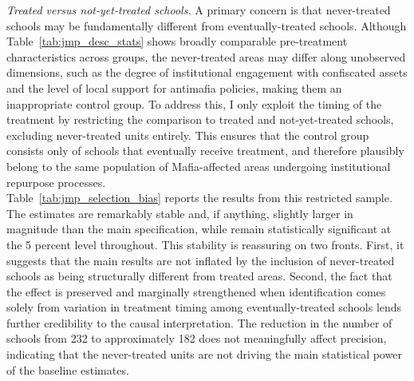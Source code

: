 \documentclass[12pt]{article}
\theoremstyle{plain}
\theoremstyle{plain}
\theoremstyle{plain}
\theoremstyle{definition}
\theoremstyle{plain}
\theoremstyle{definition}
\theoremstyle{plain}
\theoremstyle{remark}
\theoremstyle{definition}
\theoremstyle{definition}
\theoremstyle{plain}
\begin{document}
\emph{Treated versus not-yet-treated schools.} A primary concern is that never-treated schools may be fundamentally different from eventually-treated schools. Although Table~\ref{tab:jmp_desc_stats} shows broadly comparable pre-treatment characteristics across groups, the never-treated areas may differ along unobserved dimensions, such as the degree of institutional engagement with confiscated assets and the level of local support for antimafia policies, making them an inappropriate control group. To address this, I only exploit the timing of the treatment by restricting the comparison to treated and not-yet-treated schools, excluding never-treated units entirely. This ensures that the control group consists only of schools that eventually receive treatment, and therefore plausibly belong to the same population of Mafia-affected areas undergoing institutional repurpose processes. \\
Table~\ref{tab:jmp_selection_bias} reports the results from this restricted sample. The estimates are remarkably stable and, if anything, slightly larger in magnitude than the main specification, while remain statistically significant at the 5 percent level throughout. This stability is reassuring on two fronts. First, it suggests that the main results are not inflated by the inclusion of never-treated schools as being structurally different from treated areas. Second, the fact that the effect is preserved and marginally strengthened  when identification comes solely from variation in treatment timing among eventually-treated schools lends further credibility to the causal interpretation. The reduction in the number of schools from 232 to approximately 182 does not meaningfully affect precision, indicating that the never-treated units are not driving the main statistical power of the baseline estimates.
\end{document}
